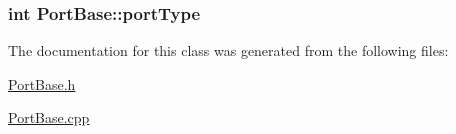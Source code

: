 \subsubsection[{\texorpdfstring{port\+Type}{portType}}]{\setlength{\rightskip}{0pt plus 5cm}int Port\+Base\+::port\+Type\hspace{0.3cm}{\ttfamily [protected]}}\hypertarget{classPortBase_a6f18d480ef41a91fd2957927fe94c408}{}\label{classPortBase_a6f18d480ef41a91fd2957927fe94c408}


The documentation for this class was generated from the following files\+:\begin{DoxyCompactItemize}
\item 
\hyperlink{PortBase_8h}{Port\+Base.\+h}\item 
\hyperlink{PortBase_8cpp}{Port\+Base.\+cpp}\end{DoxyCompactItemize}
